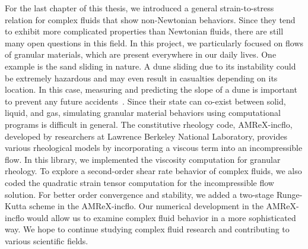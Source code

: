 \par
For the last chapter of this thesis, we introduced a general strain-to-stress relation for complex fluids that show non-Newtonian behaviors. 
Since they tend to exhibit more complicated properties than Newtonian fluids,
there are still many open questions in this field.
In this project, we particularly focused on flows of granular materials, which are present everywhere in our daily lives. 
One example is the sand sliding in nature. A dune sliding due to its instability could be extremely hazardous and may even result in casualties depending on its location. In this case, measuring and predicting the slope of a dune is important to prevent any future accidents~\cite{xie_summary_2021}.
Since their state can co-exist between solid, liquid, and gas, simulating granular material behaviors using computational programs is difficult in general. 
The constitutive rheology code, AMReX-incflo, developed by researchers at Lawrence Berkeley National Laboratory, provides various rheological models by incorporating a viscous term into an incompressible flow. 
In this library, we implemented the viscosity computation for granular rheology. 
To explore a second-order shear rate behavior of complex fluids, we also coded the quadratic strain tensor computation for the incompressible flow solution. 
For better order convergence and stability, we added a two-stage Runge-Kutta scheme in the AMReX-incflo. 
Our numerical development in the AMReX-incflo would allow us to examine complex fluid behavior in a more sophisticated way.
We hope to continue studying complex fluid research and contributing to various scientific fields. 
